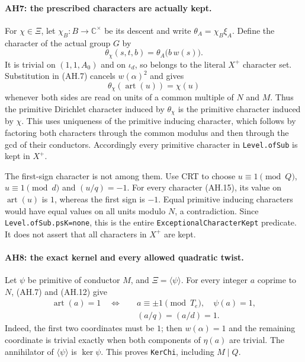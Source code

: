 \paragraph{AH7: the prescribed characters are actually kept.}
For $\chi\in\Xi$, let $\chi_B:B\to\mathbb C^\times$ be its descent and
write $\theta_A=\chi_B\xi_A$. Define the character of the actual group $G$
by
\[
 \theta_\chi(s,t,b)=\theta_A\bigl(b\,w(s)\bigr). \tag{AH.15}
\]
It is trivial on $(1,1,A_0)$ and on $\iota_d$, so belongs to the literal
$X^+$ character set. Substitution in (AH.7) cancels $w(\alpha)^2$ and gives
\[
       \theta_\chi(\operatorname{art}(u))=\chi(u)                 \tag{AH.16}
\]
whenever both sides are read on units of a common multiple of $N$ and $M$.
Thus the primitive Dirichlet character induced by $\theta_\chi$ is the
primitive character induced by $\chi$. This uses uniqueness of the
primitive inducing character, which follows by factoring both characters
through the common modulus and then through the gcd of their conductors.
Accordingly every primitive character in \texttt{Level.ofSub} is kept in
$X^+$.

The first-sign character is not among them. Use CRT to choose
$u\equiv1\pmod Q$, $u\equiv1\pmod d$ and $(u/q)=-1$.
For every character (AH.15), its value on $\operatorname{art}(u)$ is $1$,
whereas the first sign is $-1$. Equal primitive inducing characters would
have equal values on all units modulo $N$, a contradiction. Since
\texttt{Level.ofSub.psK=none}, this is the entire
\texttt{ExceptionalCharacterKept} predicate. It does not assert that all
characters in $X^+$ are kept.

\paragraph{AH8: the exact kernel and every allowed quadratic twist.}
Let $\psi$ be primitive of conductor $M$, and $\Xi=\langle\psi\rangle$.
For every integer $a$ coprime to $N$, (AH.7) and (AH.12) give
\[
 \begin{split}
 \operatorname{art}(a)=1\quad\Longleftrightarrow\quad&
 a\equiv\pm1\pmod{T_e},\quad\psi(a)=1,\\
 & (a/q)=(a/d)=1. 
 \end{split}                                                     \tag{AH.17}
\]
Indeed, the first two coordinates must be $1$; then $w(\alpha)=1$ and
the remaining coordinate is trivial exactly when both components of
$\eta(a)$ are trivial. The annihilator of $\langle\psi\rangle$ is
$\ker\psi$. This proves \texttt{KerChi}, including $M\mid Q$.

